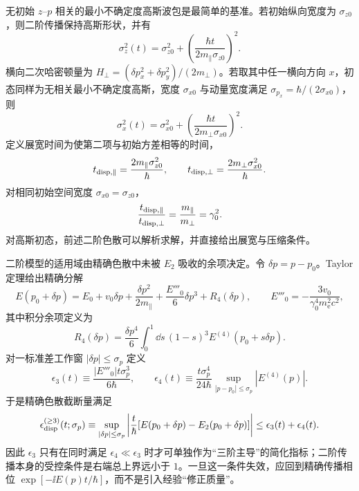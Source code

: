 无初始 $z$--$p$ 相关的最小不确定度高斯波包是最简单的基准。若初始纵向宽度为 $\sigma_{z0}$，则二阶传播保持高斯形状，并有
\[
\sigma_z^2(t)
=\sigma_{z0}^2+
\left(\frac{\hbar t}{2m_\parallel\sigma_{z0}}\right)^2.
\]
横向二次哈密顿量为 $H_\perp=(\delta p_x^2+\delta p_y^2)/(2m_\perp)$。若取其中任一横向方向 $x$，初态同样为无相关最小不确定度高斯，宽度 $\sigma_{x0}$ 与动量宽度满足 $\sigma_{p_x}=\hbar/(2\sigma_{x0})$，则
\[
\sigma_x^2(t)
=\sigma_{x0}^2+
\left(\frac{\hbar t}{2m_\perp\sigma_{x0}}\right)^2.
\]
定义展宽时间为使第二项与初始方差相等的时间，
\[
t_{\rm disp,\parallel}
=\frac{2m_\parallel\sigma_{z0}^2}{\hbar},
\qquad
t_{\rm disp,\perp}
=\frac{2m_\perp\sigma_{x0}^2}{\hbar}.
\]
对相同初始空间宽度 $\sigma_{x0}=\sigma_{z0}$，
\[
\frac{t_{\rm disp,\parallel}}{t_{\rm disp,\perp}}
=\frac{m_\parallel}{m_\perp}=\gamma_0^2.
\]
对高斯初态，前述二阶色散可以解析求解，并直接给出展宽与压缩条件。

二阶模型的适用域由精确色散中未被 $E_2$ 吸收的余项决定。令 $\delta p=p-p_0$。Taylor 定理给出精确分解
\[
E(p_0+\delta p)
=E_0+v_0\delta p+\frac{\delta p^2}{2m_\parallel}
+\frac{E'''_0}{6}\delta p^3+R_4(\delta p),
\qquad
E'''_0=-\frac{3v_0}{\gamma_0^4m_{\mathrm e}^2c^2},
\]
其中积分余项定义为
\[
R_4(\delta p)
=\frac{\delta p^4}{6}
\int_0^1\dd s\,(1-s)^3
E^{(4)}(p_0+s\delta p).
\]
对一标准差工作窗 $|\delta p|\le\sigma_p$ 定义
\[
\epsilon_3(t)
\equiv\frac{|E'''_0|t\sigma_p^3}{6\hbar},
\qquad
\epsilon_4(t)
\equiv
\frac{t\sigma_p^4}{24\hbar}
\sup_{|p-p_0|\le\sigma_p}|E^{(4)}(p)|.
\]
于是精确色散截断量满足
\begin{equation}
{
\epsilon_{\rm disp}^{(\ge3)}(t;\sigma_p)
\equiv
\sup_{|\delta p|\le\sigma_p}
\left|\frac{t}{\hbar}[E(p_0+\delta p)-E_2(p_0+\delta p)]\right|
\le\epsilon_3(t)+\epsilon_4(t).}
\label{eq:electron_dispersion_cubic_control}
\end{equation}
因此 $\epsilon_3$ 只有在同时满足 $\epsilon_4\ll\epsilon_3$ 时才可单独作为“三阶主导”的简化指标；二阶传播本身的受控条件是右端总上界远小于 $1$。一旦这一条件失效，应回到精确传播相位 $\exp[-\ii E(p)t/\hbar]$，而不是引入经验“修正质量”。

